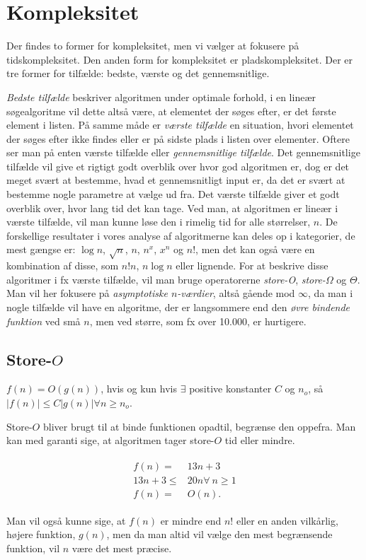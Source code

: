 \section{Kompleksitet} \label{kap:kompleksitet}

Der findes to former for kompleksitet, men vi vælger at fokusere på tidskompleksitet. Den anden form for kompleksitet er pladskompleksitet. 
Der er tre former for tilfælde: bedste, værste og det gennemsnitlige. 

\emph{Bedste tilfælde} beskriver algoritmen under optimale forhold, i en lineær søgealgoritme vil dette altså være, at elementet der søges efter, er det første element i listen. På samme måde er \emph{værste tilfælde} en situation, hvori elementet der søges efter ikke findes eller er på sidste plads i listen over elementer.
Oftere ser man på enten værste tilfælde eller \emph{gennemsnitlige tilfælde}. 
Det gennemsnitlige tilfælde vil give et rigtigt godt overblik over hvor god algoritmen er, dog er det meget svært at bestemme, hvad et gennemsnitligt input er, da det er svært at bestemme nogle parametre at vælge ud fra. 
Det værste tilfælde giver et godt overblik over, hvor lang tid det kan tage. Ved man, at algoritmen er lineær i værste tilfælde, vil man kunne løse den i rimelig tid for alle størrelser, $n$.
De forskellige resultater i vores analyse af algoritmerne kan deles op i kategorier, de mest gængse er: $\log n$, $\sqrt{n}$, $n$, $n^x$, $x^n$ og $n!$, men det kan også være en kombination af disse, som $n!n$, $n\log n$ eller lignende.
For at beskrive disse algoritmer i fx værste tilfælde, vil man bruge operatorerne \emph{store-O}, \emph{store-$\Omega$} og \emph{$\Theta$}. Man vil her fokusere på \emph{asymptotiske $n$-værdier}, altså gående mod $\infty$, da man i nogle tilfælde vil have en algoritme, der er langsommere end den \emph{øvre bindende funktion} ved små $n$, men ved større, som fx over 10.000, er hurtigere.

\subsection{Store-$O$}
\begin{defn}
$f(n)= O(g(n))$, hvis og kun hvis $\exists$ positive konstanter $C$ og $n_o$, så $|f(n)| \leq C |g(n)| \forall n \geq n_o$.
\end{defn}

Store-$O$ bliver brugt til at binde funktionen opadtil, begrænse den oppefra. Man kan med garanti sige, at algoritmen tager store-$O$ tid eller mindre. 
\begin{exmp}
\begin{align}
\begin{split}
f(n)=& 13n+3 \\
13n+3 \leq& 20n \forall \ n \geq 1 \\
f(n) =& O(n).
\end{split}
\end{align}
\end{exmp}
Man vil også kunne sige, at $f(n)$ er mindre end $n!$ eller en anden vilkårlig, højere funktion, $g(n)$, men da man altid vil vælge den mest begrænsende funktion, vil $n$ være det mest præcise. 

